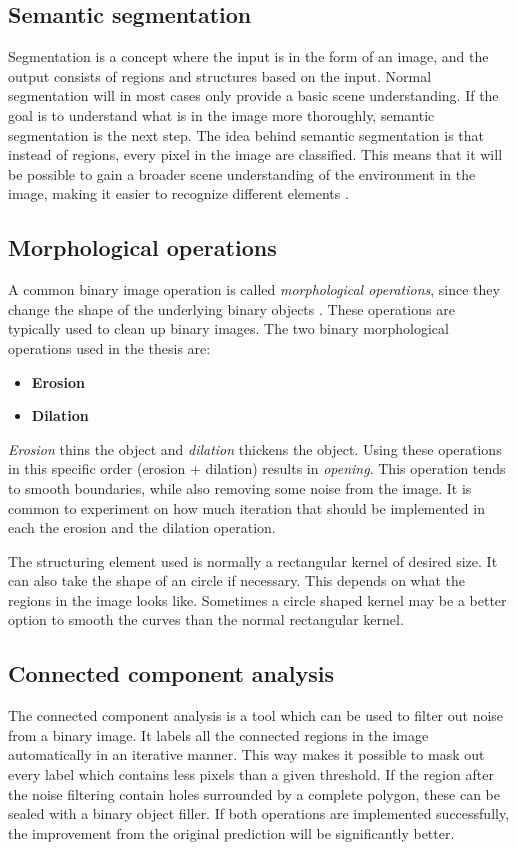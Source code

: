 \documentclass[USenglish]{ifimaster}  %
\begin{document}
\subsection{Semantic segmentation}
Segmentation is a concept where the input is in the form of an image, and the output consists of regions and structures based on the input. Normal segmentation will in most cases only provide a basic scene understanding. If the goal is to understand what is in the image more thoroughly, semantic segmentation is the next step. The idea behind semantic segmentation is that instead of regions, every pixel in the image are classified. This means that it will be possible to gain a broader scene understanding of the environment in the image, making it easier to recognize different elements \cite{website:semantic_segmentation}.

\subsection{Morphological operations}
A common binary image operation is called \textit{morphological operations}, since
they change the shape of the underlying binary objects \cite{Ritter}. These operations are typically used to clean up binary images. The two binary morphological operations used in the thesis are: 
\newline
\begin{itemize}
    \item \textbf{Erosion}
    \item \textbf{Dilation}
\end{itemize}
\textit{Erosion} thins the object and \textit{dilation} thickens the object. Using these operations in this specific order (erosion + dilation) results in \textit{opening}. This operation tends to smooth boundaries, while also removing some noise from the image. It is common to experiment on how much iteration that should be implemented in each the erosion and the dilation operation.

The structuring element used is normally a rectangular kernel of desired size. It can also take the shape of an circle if necessary. This depends on what the regions in the image looks like. Sometimes a circle shaped kernel may be a better option to smooth the curves than the normal rectangular kernel.

\subsection{Connected component analysis}
The connected component analysis is a tool which can be used to filter out noise from a binary image. It labels all the connected regions in the image automatically in an iterative manner. This way makes it possible to mask out every label which contains less pixels than a given threshold. If the region after the noise filtering contain holes surrounded by a complete polygon, these can be sealed with a binary object filler. If both operations are implemented successfully, the improvement from the original prediction will be significantly better.
\end{document}
